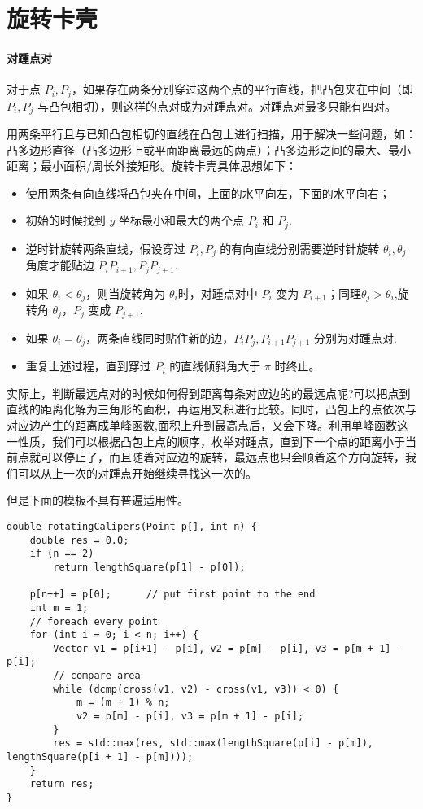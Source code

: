 \section{旋转卡壳}
\paragraph{对踵点对} 对于点 $P_i, P_j$，如果存在两条分别穿过这两个点的平行直线，把凸包夹在中间（即 $P_i, P_j$ 与凸包相切），则这样的点对成为对踵点对。对踵点对最多只能有四对。

\noindent 用两条平行且与已知凸包相切的直线在凸包上进行扫描，用于解决一些问题，如：凸多边形直径（凸多边形上或平面距离最远的两点）；凸多边形之间的最大、最小距离；最小面积/周长外接矩形。旋转卡壳具体思想如下：
\begin{itemize}
    \item 使用两条有向直线将凸包夹在中间，上面的水平向左，下面的水平向右；
    \item 初始的时候找到 $y$ 坐标最小和最大的两个点 $P_i$ 和 $P_j$.
    \item 逆时针旋转两条直线，假设穿过 $P_i, P_j$ 的有向直线分别需要逆时针旋转 $\theta_i, \theta_j$角度才能贴边 $P_iP_{i+1}, P_jP_{j+1}$.
    \item 如果 $\theta_i < \theta_j$，则当旋转角为 $\theta_i$时，对踵点对中 $P_i$ 变为 $P_{i+1}$；同理$\theta_j > \theta_i$,旋转角 $\theta_j$，$P_j$ 变成 $P_{j+1}$.
    \item 如果 $\theta_i = \theta_j$，两条直线同时贴住新的边，$P_i P_j, P_{i+1} P_{j+1}$ 分别为对踵点对.
    \item 重复上述过程，直到穿过 $P_i$ 的直线倾斜角大于 $\pi$ 时终止。
\end{itemize}

\noindent 实际上，判断最远点对的时候如何得到距离每条对应边的的最远点呢?可以把点到直线的距离化解为三角形的面积，再运用叉积进行比较。同时，凸包上的点依次与对应边产生的距离成单峰函数,面积上升到最高点后，又会下降。利用单峰函数这一性质，我们可以根据凸包上点的顺序，枚举对踵点，直到下一个点的距离小于当前点就可以停止了，而且随着对应边的旋转，最远点也只会顺着这个方向旋转，我们可以从上一次的对踵点开始继续寻找这一次的。

\noindent 但是下面的模板不具有普遍适用性。

\begin{verbatim}
double rotatingCalipers(Point p[], int n) {
    double res = 0.0;
    if (n == 2)
        return lengthSquare(p[1] - p[0]);

    p[n++] = p[0];      // put first point to the end        
    int m = 1;
    // foreach every point
    for (int i = 0; i < n; i++) {
        Vector v1 = p[i+1] - p[i], v2 = p[m] - p[i], v3 = p[m + 1] - p[i];
        // compare area
        while (dcmp(cross(v1, v2) - cross(v1, v3)) < 0) {
            m = (m + 1) % n;
            v2 = p[m] - p[i], v3 = p[m + 1] - p[i];
        }
        res = std::max(res, std::max(lengthSquare(p[i] - p[m]), lengthSquare(p[i + 1] - p[m])));
    }
    return res;
}    
\end{verbatim}

